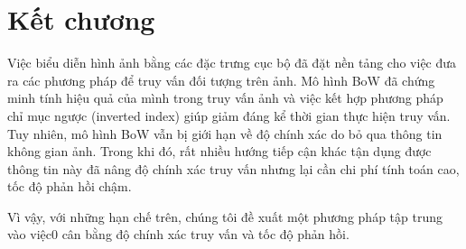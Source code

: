 \section{Kết chương}

Việc biểu diễn hình ảnh bằng các đặc trưng cục bộ đã đặt nền tảng cho việc đưa ra các phương pháp để truy vấn đối tượng trên ảnh. Mô hình BoW đã chứng minh tính hiệu quả của mình trong truy vấn ảnh và việc kết hợp phương pháp chỉ mục ngược (inverted index) giúp giảm đáng kể thời gian thực hiện truy vấn. Tuy nhiên, mô hình BoW vẫn bị giới hạn về độ chính xác do bỏ qua thông tin không gian ảnh. Trong khi đó, rất nhiều hướng tiếp cận khác tận dụng được thông tin này đã nâng độ chính xác truy vấn nhưng lại cần chi phí tính toán cao, tốc độ phản hồi chậm.

Vì vậy, với những hạn chế trên, chúng tôi đề xuất một phương pháp tập trung vào việc0 cân bằng độ chính xác truy vấn và tốc độ phản hồi. 